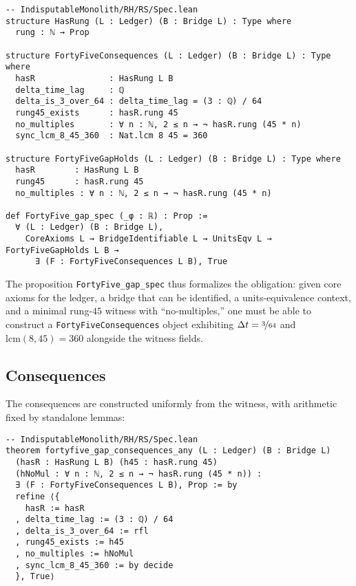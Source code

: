 \documentclass[11pt,a4paper,twoside]{article}
\numberwithin{equation}{section}
\theoremstyle{customthm}
\theoremstyle{customdef}
\theoremstyle{customrem}
\begin{document}
\begin{lstlisting}
-- IndisputableMonolith/RH/RS/Spec.lean
structure HasRung (L : Ledger) (B : Bridge L) : Type where
  rung : ℕ → Prop

structure FortyFiveConsequences (L : Ledger) (B : Bridge L) : Type where
  hasR               : HasRung L B
  delta_time_lag     : ℚ
  delta_is_3_over_64 : delta_time_lag = (3 : ℚ) / 64
  rung45_exists      : hasR.rung 45
  no_multiples       : ∀ n : ℕ, 2 ≤ n → ¬ hasR.rung (45 * n)
  sync_lcm_8_45_360  : Nat.lcm 8 45 = 360

structure FortyFiveGapHolds (L : Ledger) (B : Bridge L) : Type where
  hasR        : HasRung L B
  rung45      : hasR.rung 45
  no_multiples : ∀ n : ℕ, 2 ≤ n → ¬ hasR.rung (45 * n)

def FortyFive_gap_spec (_φ : ℝ) : Prop :=
  ∀ (L : Ledger) (B : Bridge L),
    CoreAxioms L → BridgeIdentifiable L → UnitsEqv L → FortyFiveGapHolds L B →
      ∃ (F : FortyFiveConsequences L B), True
\end{lstlisting}

The proposition \texttt{FortyFive\_gap\_spec} thus formalizes the obligation: given core axioms for the ledger, a bridge that can be identified, a units-equivalence context, and a minimal rung-$45$ witness with ``no-multiples,'' one must be able to construct a \texttt{FortyFiveConsequences} object exhibiting $\Delta t=\nicefrac{3}{64}$ and $\mathrm{lcm}(8,45)=360$ alongside the witness fields.

\subsection{Consequences}\label{subsec:gap45-consequences}

The consequences are constructed uniformly from the witness, with arithmetic fixed by standalone lemmas:

\begin{lstlisting}
-- IndisputableMonolith/RH/RS/Spec.lean
theorem fortyfive_gap_consequences_any (L : Ledger) (B : Bridge L)
  (hasR : HasRung L B) (h45 : hasR.rung 45)
  (hNoMul : ∀ n : ℕ, 2 ≤ n → ¬ hasR.rung (45 * n)) :
  ∃ (F : FortyFiveConsequences L B), Prop := by
  refine ⟨{
    hasR := hasR
  , delta_time_lag := (3 : ℚ) / 64
  , delta_is_3_over_64 := rfl
  , rung45_exists := h45
  , no_multiples := hNoMul
  , sync_lcm_8_45_360 := by decide
  }, True⟩
\end{lstlisting}
\end{document}
